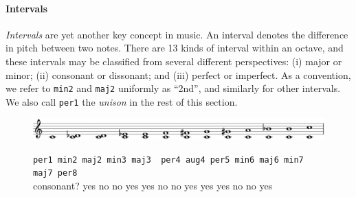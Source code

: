 \paragraph{Intervals}

\emph{Intervals} are yet another key concept in music.
An interval denotes the difference in pitch between two notes.
There are 13 kinds of interval within an octave, and these intervals
may be classified from several different perspectives: (i) major or minor;
(ii) consonant or dissonant; and (iii) perfect or imperfect.
As a convention, we refer to \texttt{min2} and \texttt{maj2}  uniformly
as ``2nd'', and similarly for other intervals.
We also call \texttt{per1} the \emph{unison} in the rest of this section.

\begin{figure}[h]
  \includegraphics[width=12cm]{fig/interval.png} \\
  \begin{flushleft}
    \begin{footnotesize}
      \hspace{1.45cm} \texttt{per1 \hspace{0.5mm} min2  \hspace{2.5mm}
        maj2 \hspace{1.2mm} min3 \hspace{0.5mm} maj3 \ per4
        \hspace{1mm}aug4
        \hspace{0.5mm}  per5\hspace{1.2mm}  min6\hspace{1.6mm} maj6
        \hspace{1.6mm}min7\hspace{1.2mm} maj7\hspace{1.2mm} per8} \\
      consonant? \hspace{1.5mm} yes \hspace{4mm} no \hspace{7mm}  no
      \hspace{4.5mm} yes \hspace{3.8mm}  yes \hspace{3.5mm} no \hspace{3.5mm}
      no \hspace{4mm} yes \hspace{4mm} yes \hspace{3.2mm} yes
      \hspace{3.7mm} no \hspace{4mm} no \hspace{3.8mm} yes
    \end{footnotesize}
  \end{flushleft}
\end{figure}